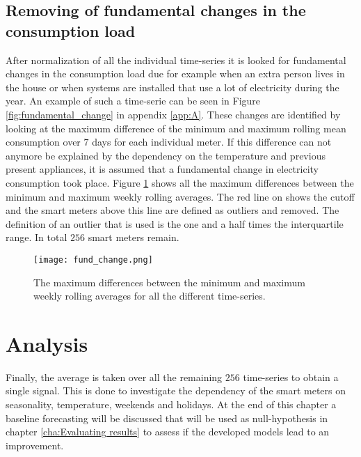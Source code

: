 \subsection{Removing of fundamental changes in the consumption load} 
After normalization of all the individual time-series it is looked for fundamental changes in the consumption load due for example when an extra person lives in the house or when systems are installed that use a lot of electricity during the year. An example of such a time-serie can be seen in Figure \ref{fig:fundamental_change} in appendix \ref{app:A}.
These changes are identified by looking at the maximum difference of the minimum and maximum rolling mean consumption over $ 7 $ days for each individual meter. If this difference can not anymore be explained by the dependency on the temperature and previous present appliances, it is assumed that a fundamental change in electricity consumption took place. 
 Figure \ref{fig:fund_change} shows all the maximum differences between the minimum and maximum weekly rolling averages. The red line on shows the cutoff and the smart meters above this line are defined as outliers and removed. The definition of an outlier that is used is the one and a half times the interquartile range. In total $ 256 $ smart meters remain. 


\begin{figure}[h!]
	\centering
	\texttt{[image: fund\_change.png]}
	\caption{The maximum differences between the minimum and maximum weekly rolling averages for all the different time-series.}
	\label{fig:fund_change}
\end{figure}




\section{Analysis}\label{s:Analysis}
Finally, the average is taken over all the remaining $256$ time-series to obtain a single signal. This is done to investigate the dependency of the smart meters on seasonality, temperature, weekends and holidays. At the end of this chapter a baseline forecasting will be discussed that will be used as null-hypothesis in chapter \ref{cha:Evaluating results} to assess if the developed models lead to an improvement.

